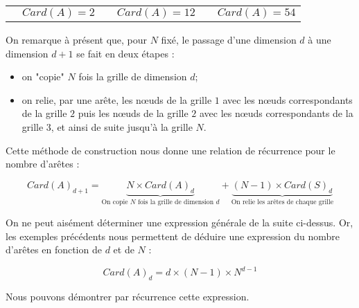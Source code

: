\begin{center}
\begin{tabular}{cccccc}
 & $Card(A) = 2$ & & $Card(A) = 12$ & & $Card(A) = 54$ \\


\end{tabular}

\end{center}

On remarque à présent que, pour $N$ fixé, le passage d'une dimension $d$ à une dimension $d+1$ se fait en deux étapes :
\begin{itemize}
\item on "copie" $N$ fois la grille de dimension $d$;
\item on relie, par une arête, les nœuds de la grille $1$ avec les nœuds correspondants de la grille $2$ puis les nœuds de la grille $2$ avec les nœuds correspondants de la grille $3$, et ainsi de suite jusqu'à la grille $N$.
\end{itemize}

Cette méthode de construction nous donne une relation de récurrence pour le nombre d'arêtes : 

$$Card(A)_{d+1} = \underbrace{N \times Card(A)_d}_{\text{On copie }N\text{ fois la grille de dimension }d} + \underbrace{(N-1)\times Card(S)_d}_{\text{On relie les arêtes de chaque grille}}$$

On ne peut aisément déterminer une expression générale de la suite ci-dessus. Or, les exemples précédents nous permettent de déduire une expression du nombre d'arêtes en fonction de $d$ et de $N$ : 

$$Card(A)_d = d\times (N-1)\times N^{d-1}$$

Nous pouvons démontrer par récurrence cette expression.

